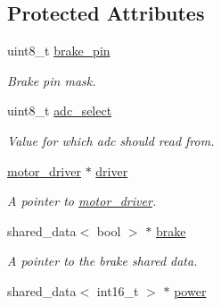 \subsection*{\-Protected \-Attributes}
\begin{DoxyCompactItemize}
\item 
\hypertarget{classtask__motor_a3f10bbf8d028b18a2a4427f1c152be53}{uint8\-\_\-t \hyperlink{classtask__motor_a3f10bbf8d028b18a2a4427f1c152be53}{brake\-\_\-pin}}\label{classtask__motor_a3f10bbf8d028b18a2a4427f1c152be53}

\begin{DoxyCompactList}\small\item\em \-Brake pin mask. \end{DoxyCompactList}\item 
\hypertarget{classtask__motor_ae64744376a44ba347c8f37afd7311ab7}{uint8\-\_\-t \hyperlink{classtask__motor_ae64744376a44ba347c8f37afd7311ab7}{adc\-\_\-select}}\label{classtask__motor_ae64744376a44ba347c8f37afd7311ab7}

\begin{DoxyCompactList}\small\item\em \-Value for which adc should read from. \end{DoxyCompactList}\item 
\hypertarget{classtask__motor_ad9d344255e29de67611998bf77658d9f}{\hyperlink{classmotor__driver}{motor\-\_\-driver} $\ast$ \hyperlink{classtask__motor_ad9d344255e29de67611998bf77658d9f}{driver}}\label{classtask__motor_ad9d344255e29de67611998bf77658d9f}

\begin{DoxyCompactList}\small\item\em \-A pointer to \hyperlink{classmotor__driver}{motor\-\_\-driver}. \end{DoxyCompactList}\item 
\hypertarget{classtask__motor_a22d847bf1b45ed005a6f6393cb37d327}{shared\-\_\-data$<$ bool $>$ $\ast$ \hyperlink{classtask__motor_a22d847bf1b45ed005a6f6393cb37d327}{brake}}\label{classtask__motor_a22d847bf1b45ed005a6f6393cb37d327}

\begin{DoxyCompactList}\small\item\em \-A pointer to the brake shared data. \end{DoxyCompactList}\item 
\hypertarget{classtask__motor_a291245b7c83dae649f310caf016ab959}{shared\-\_\-data$<$ int16\-\_\-t $>$ $\ast$ \hyperlink{classtask__motor_a291245b7c83dae649f310caf016ab959}{power}}\label{classtask__motor_a291245b7c83dae649f310caf016ab959}


\end{DoxyCompactItemize}
